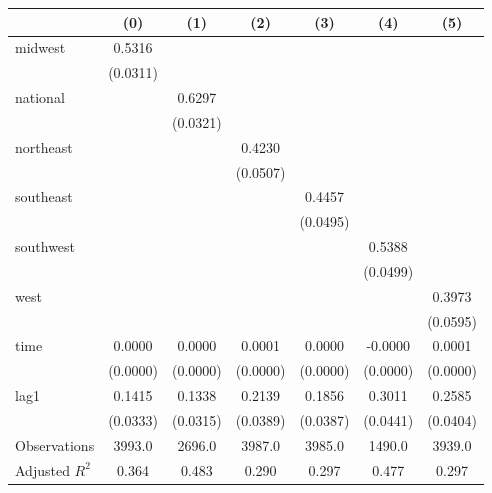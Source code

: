 \begin{tabular}{lcccccc}
\toprule
 & (0) & (1) & (2) & (3) & (4) & (5) \\
\midrule
midwest & 0.5316 &  &  &  &  &  \\
\vspace{0.2cm}
 & (0.0311) &  &  &  &  &  \\
national &  & 0.6297 &  &  &  &  \\
\vspace{0.2cm}
 &  & (0.0321) &  &  &  &  \\
northeast &  &  & 0.4230 &  &  &  \\
\vspace{0.2cm}
 &  &  & (0.0507) &  &  &  \\
southeast &  &  &  & 0.4457 &  &  \\
\vspace{0.2cm}
 &  &  &  & (0.0495) &  &  \\
southwest &  &  &  &  & 0.5388 &  \\
\vspace{0.2cm}
 &  &  &  &  & (0.0499) &  \\
west &  &  &  &  &  & 0.3973 \\
\vspace{0.2cm}
 &  &  &  &  &  & (0.0595) \\
time & 0.0000 & 0.0000 & 0.0001 & 0.0000 & -0.0000 & 0.0001 \\
\vspace{0.2cm}
 & (0.0000) & (0.0000) & (0.0000) & (0.0000) & (0.0000) & (0.0000) \\
lag1 & 0.1415 & 0.1338 & 0.2139 & 0.1856 & 0.3011 & 0.2585 \\
\vspace{0.2cm}
 & (0.0333) & (0.0315) & (0.0389) & (0.0387) & (0.0441) & (0.0404) \\
\midrule
Observations & 3993.0 & 2696.0 & 3987.0 & 3985.0 & 1490.0 & 3939.0 \\
Adjusted $R^2$ & 0.364 & 0.483 & 0.290 & 0.297 & 0.477 & 0.297 \\
\bottomrule
\end{tabular}